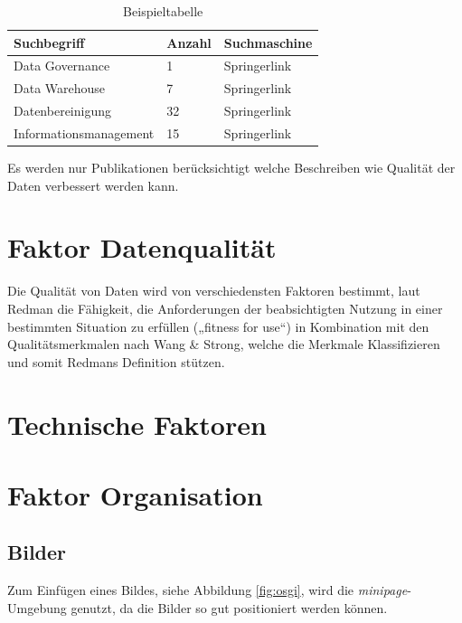 \documentclass[12pt,a4paper,bibliography=totocnumbered,listof=totocnumbered]{scrartcl}
\begin{document}
\vspace{1em}
\begin{table}[!h]
	\centering
	\begin{tabular}{|l|l|l|}
		\hline
		\textbf{Suchbegriff} & \textbf{Anzahl} & \textbf{Suchmaschine}\\
		\hline
		Data Governance & 1 & Springerlink\\
		\hline
		Data Warehouse
 & 7 & Springerlink\\
		\hline
		Datenbereinigung  & 32 & Springerlink\\
		\hline
		
		Informationsmanagement  & 15 & Springerlink\\
		\hline
	\end{tabular}
	\caption{Beispieltabelle}
	\label{tab:beispiel}
\end{table}

Es werden nur Publikationen berücksichtigt welche Beschreiben wie Qualität der Daten verbessert werden kann.

  
\section{Faktor Datenqualität}
Die Qualität von Daten wird von verschiedensten Faktoren bestimmt,  laut Redman die Fähigkeit, die Anforderungen der beabsichtigten
Nutzung in einer bestimmten Situation zu erfüllen („fitness for use“) \cite{redman} in Kombination mit den Qualitätsmerkmalen nach Wang & Strong, welche die Merkmale Klassifizieren und somit Redmans Definition stützen. 

\section{Technische Faktoren}
\section{Faktor Organisation}

\subsection{Bilder}
Zum Einfügen eines Bildes, siehe Abbildung \ref{fig:osgi}, wird die \textit{minipage}-Umgebung genutzt, da die Bilder so gut positioniert werden können.
\end{document}
